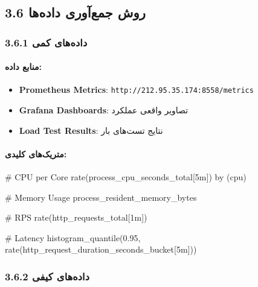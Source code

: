 \documentclass[
]{article}
\newenvironment{Shaded}{}{}
\newcommand{\NormalTok}[1]{#1}
\providecommand{\tightlist}{%
  \setlength{\itemsep}{0pt}\setlength{\parskip}{0pt}}
\begin{document}
\subsection{3.6 روش جمع‌آوری
داده‌ها}\label{ux631ux648ux634-ux62cux645ux639ux622ux648ux631ux6cc-ux62fux627ux62fux647ux647ux627}

\subsubsection{3.6.1 داده‌های
کمی}\label{ux62fux627ux62fux647ux647ux627ux6cc-ux6a9ux645ux6cc}

\paragraph{منابع
داده:}\label{ux645ux646ux627ux628ux639-ux62fux627ux62fux647}

\begin{itemize}
\tightlist
\item
  \textbf{Prometheus Metrics}:
  \texttt{http://212.95.35.174:8558/metrics}
\item
  \textbf{Grafana Dashboards}: تصاویر واقعی عملکرد
\item
  \textbf{Load Test Results}: نتایج تست‌های بار
\end{itemize}

\paragraph{متریک‌های
کلیدی:}\label{ux645ux62aux631ux6ccux6a9ux647ux627ux6cc-ux6a9ux644ux6ccux62fux6cc-1}

\begin{Shaded}
\begin{Highlighting}[]
\NormalTok{\# CPU per Core}
\NormalTok{rate(process\_cpu\_seconds\_total[5m]) by (cpu)}

\NormalTok{\# Memory Usage}
\NormalTok{process\_resident\_memory\_bytes}

\NormalTok{\# RPS}
\NormalTok{rate(http\_requests\_total[1m])}

\NormalTok{\# Latency}
\NormalTok{histogram\_quantile(0.95, rate(http\_request\_duration\_seconds\_bucket[5m]))}
\end{Highlighting}
\end{Shaded}

\subsubsection{3.6.2 داده‌های
کیفی}\label{ux62fux627ux62fux647ux647ux627ux6cc-ux6a9ux6ccux641ux6cc}
\end{document}
